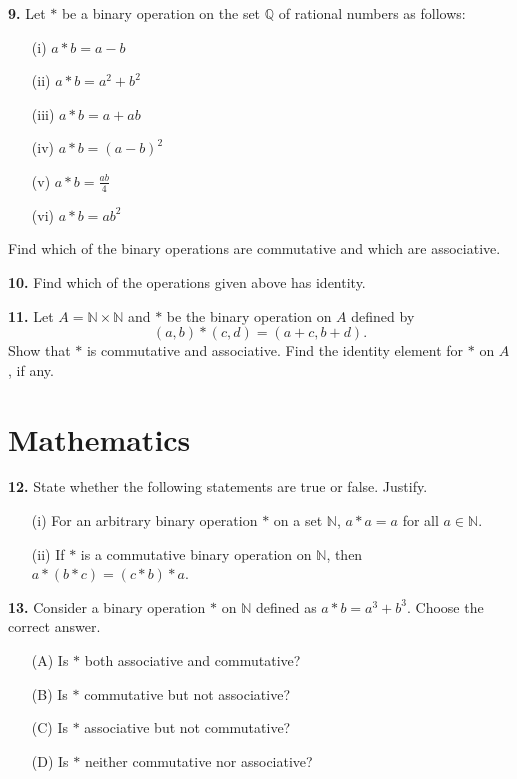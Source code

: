 \documentclass[a4paper,12pt]{article}
\begin{document}
\textbf{9.} Let $*$ be a binary operation on the set $\mathbb{Q}$ of rational numbers as follows:

\begin{enumerate}
    \item[(i)] $a * b = a - b$
    \item[(ii)] $a * b = a^2 + b^2$
    \item[(iii)] $a * b = a + ab$
    \item[(iv)] $a * b = (a - b)^2$
    \item[(v)] $a * b = \frac{ab}{4}$
    \item[(vi)] $a * b = ab^2$
\end{enumerate}

Find which of the binary operations are commutative and which are associative.

\textbf{10.} Find which of the operations given above has identity.

\textbf{11.} Let $A = \mathbb{N} \times \mathbb{N}$ and $*$ be the binary operation on $A$ defined by
\[
(a, b) * (c, d) = (a + c, b + d).
\]
Show that $*$ is commutative and associative. Find the identity element for $*$ on $A$, if any.

\section*{Mathematics}

\textbf{12.} State whether the following statements are true or false. Justify.

\begin{enumerate}
    \item[(i)] For an arbitrary binary operation $*$ on a set $\mathbb{N}$, $a * a = a$ for all $a \in \mathbb{N}$.
    \item[(ii)] If $*$ is a commutative binary operation on $\mathbb{N}$, then $a * (b * c) = (c * b) * a$.
\end{enumerate}

\textbf{13.} Consider a binary operation $*$ on $\mathbb{N}$ defined as $a * b = a^3 + b^3$. Choose the correct answer.

\begin{enumerate}
    \item[(A)] Is $*$ both associative and commutative?
    \item[(B)] Is $*$ commutative but not associative?
    \item[(C)] Is $*$ associative but not commutative?
    \item[(D)] Is $*$ neither commutative nor associative?
\end{enumerate}
\end{document}
